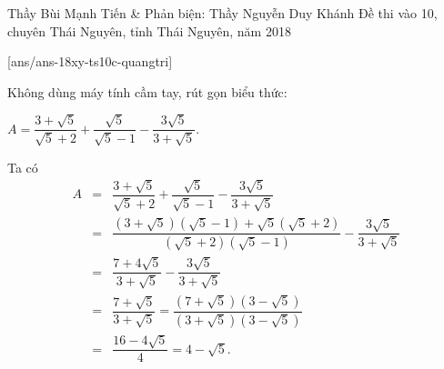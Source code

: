 \begin{name}
{Thầy  Bùi Mạnh Tiến \& Phản biện: Thầy Nguyễn Duy Khánh}
{Đề thi vào 10, chuyên Thái Nguyên, tỉnh Thái Nguyên, năm 2018}
\end{name}
\setcounter{ex}{0}
[ans/ans-18xy-ts10c-quangtri]
\begin{ex}%
	Không dùng máy tính cầm tay, rút gọn biểu thức:
	\begin{center}
		$A=\dfrac{3+\sqrt{5}}{\sqrt{5}+2}+\dfrac{\sqrt{5}}{\sqrt{5}-1}-\dfrac{3\sqrt{5}}{3+\sqrt{5}}.$
	\end{center}	
	\loigiai
	{
		Ta có 
		\begin{eqnarray*}
			A&=& \dfrac{3+\sqrt{5}}{\sqrt{5}+2}+\dfrac{\sqrt{5}}{\sqrt{5}-1}-\dfrac{3\sqrt{5}}{3+\sqrt{5}}\\
			&= & \dfrac{\left(3+\sqrt{5}\right)\left(\sqrt{5}-1\right)+\sqrt{5}\left(\sqrt{5}+2\right)}{\left(\sqrt{5}+2\right)\left(\sqrt{5}-1\right)}-\dfrac{3\sqrt{5}}{3+\sqrt{5}}\\
			&= &\dfrac{7+4\sqrt{5}}{3+\sqrt{5}}-\dfrac{3\sqrt{5}}{3+\sqrt{5}}\\
			&= &\dfrac{7+\sqrt{5}}{3+\sqrt{5}}=\dfrac{\left(7+\sqrt{5}\right)\left(3-\sqrt{5}\right)}{\left(3+\sqrt{5}\right)\left(3-\sqrt{5}\right)}\\
			&= &\dfrac{16-4\sqrt{5}}{4}=4-\sqrt{5}. 
		\end{eqnarray*}
	}
\end{ex}

